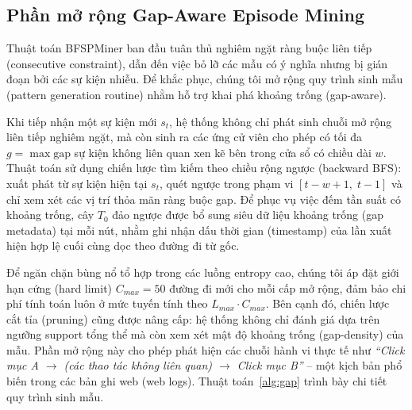 \documentclass{article}
\begin{document}
\vspace{-0.5em}
\subsection{Phần mở rộng Gap-Aware Episode Mining}
Thuật toán BFSPMiner ban đầu tuân thủ nghiêm ngặt ràng buộc liên tiếp (consecutive constraint), dẫn đến việc bỏ lỡ các mẫu có ý nghĩa nhưng bị gián đoạn bởi các sự kiện nhiễu. Để khắc phục, chúng tôi mở rộng quy trình sinh mẫu (pattern generation routine) nhằm hỗ trợ khai phá khoảng trống (gap-aware). 

Khi tiếp nhận một sự kiện mới $s_t$, hệ thống không chỉ phát sinh chuỗi mở rộng liên tiếp nghiêm ngặt, mà còn sinh ra các ứng cử viên cho phép có tối đa $g = \max\text{gap}$ sự kiện không liên quan xen kẽ bên trong cửa sổ có chiều dài $w$. Thuật toán sử dụng chiến lược tìm kiếm theo chiều rộng ngược (backward BFS): xuất phát từ sự kiện hiện tại $s_t$, quét ngược trong phạm vi $[t - w + 1,\; t - 1]$ và chỉ xem xét các vị trí thỏa mãn ràng buộc gap. Để phục vụ việc đếm tần suất có khoảng trống, cây $T_0$ đảo ngược được bổ sung siêu dữ liệu khoảng trống (gap metadata) tại mỗi nút, nhằm ghi nhận dấu thời gian (timestamp) của lần xuất hiện hợp lệ cuối cùng dọc theo đường đi từ gốc.

Để ngăn chặn bùng nổ tổ hợp trong các luồng entropy cao, chúng tôi áp đặt giới hạn cứng (hard limit) $C_{max} = 50$ đường đi mới cho mỗi cấp mở rộng, đảm bảo chi phí tính toán luôn ở mức tuyến tính theo $L_{max} \cdot C_{max}$. Bên cạnh đó, chiến lược cắt tỉa (pruning) cũng được nâng cấp: hệ thống không chỉ đánh giá dựa trên ngưỡng support tổng thể mà còn xem xét mật độ khoảng trống (gap-density) của mẫu. Phần mở rộng này cho phép phát hiện các chuỗi hành vi thực tế như \textit{``Click mục A $\rightarrow$ (các thao tác không liên quan) $\rightarrow$ Click mục B''} -- một kịch bản phổ biến trong các bản ghi web (web logs). Thuật toán~\ref{alg:gap} trình bày chi tiết quy trình sinh mẫu.
\end{document}
